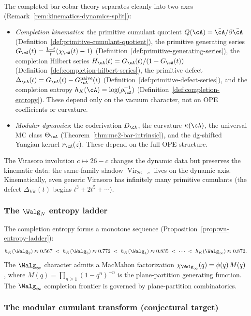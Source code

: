 The completed bar-cobar theory separates cleanly into two axes
(Remark~\ref{rem:kinematics-dynamics-split}):
\begin{itemize}
\item \emph{Completion kinematics}: the primitive cumulant quotient
 $Q(\cA) = \bar\cA / \partial\bar\cA$
 (Definition~\ref{def:primitive-cumulant-quotient}), the primitive
 generating series $G_\cA(t) = \tfrac{1-t}{t}(\chi_\cA(t)-1)$
 (Definition~\ref{def:primitive-generating-series}), the completion
 Hilbert series $H_\cA(t) = G_\cA(t)/(1-G_\cA(t))$
 (Definition~\ref{def:completion-hilbert-series}), the primitive
 defect $\Delta_\cA(t) = G_\cA(t) - G_\cA^{\mathrm{naive}}(t)$
 (Definition~\ref{def:primitive-defect-series}), and the completion
 entropy $h_K(\cA) = \log(\rho_\cA^{-1})$
 (Definition~\ref{def:completion-entropy}). These depend only on the
 vacuum character, not on OPE coefficients or curvature.
\item \emph{Modular dynamics}: the coderivation $D_\cA$, the
 curvature $\kappa(\cA)$, the universal MC class $\Theta_\cA$
 (Theorem~\ref{thm:mc2-bar-intrinsic}), and the dg-shifted Yangian
 kernel $r_\cA(z)$. These depend on the full OPE structure.
\end{itemize}
The Virasoro involution $c \mapsto 26-c$ changes the dynamic data
but preserves the kinematic data: the same-family shadow
$\operatorname{Vir}_{26-c}$ lives on the dynamic axis.
Kinematically, even generic Virasoro has infinitely many primitive
cumulants (the defect $\Delta_{\mathrm{Vir}}(t)$ begins $t^3 +
2t^5 + \cdots$).

\subsubsection*{The $\Walg_N$ entropy ladder}

The completion entropy forms a monotone sequence
(Proposition~\ref{prop:wn-entropy-ladder}):
\[
h_K(\Walg_2) \approx 0.567
\;<\; h_K(\Walg_3) \approx 0.772
\;<\; h_K(\Walg_4) \approx 0.835
\;<\; \cdots
\;<\; h_K(\Walg_\infty) \approx 0.872.
\]
The $\Walg_\infty$ character admits a MacMahon factorization
$\chi_{\Walg_\infty}(q) = \phi(q)\,M(q)$, where
$M(q) = \prod_{n\geq 1}(1-q^n)^{-n}$ is the plane-partition
generating function. The $\Walg_\infty$ completion frontier is
governed by plane-partition combinatorics.

\subsubsection*{The modular cumulant transform (conjectural target)}
\label{sss:modular-cumulant-transform}

